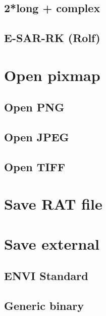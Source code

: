 \subsection{2*long + complex}
\subsection{E-SAR-RK (Rolf)}

\newpage 
\section{Open pixmap}
\subsection{Open PNG}
\subsection{Open JPEG}
\subsection{Open TIFF}

\newpage 
\section{Save RAT file}

\newpage 
\section{Save external}
\subsection{ENVI Standard}
\subsection{Generic binary}

